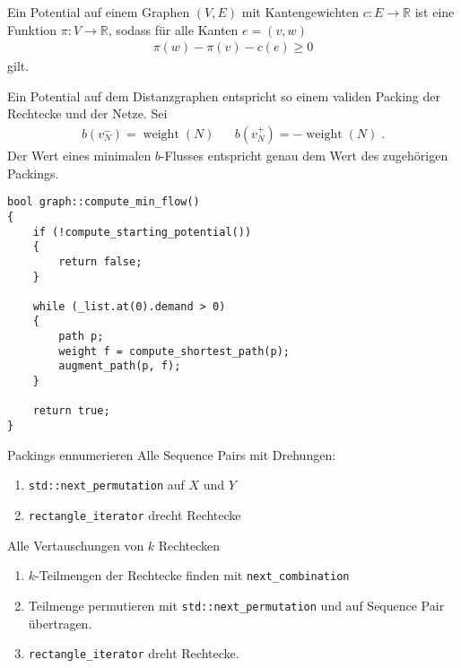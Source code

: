 \documentclass{beamer}
\DeclareMathOperator{\gewicht}{weight}
\begin{document}
\begin{frame}
 \begin{definition}[Potential]
  Ein Potential auf einem Graphen $(V,E)$ mit Kantengewichten $c\colon E \to \mathbb{R}$ ist eine Funktion $\pi\colon V\to \mathbb{R}$, sodass für alle Kanten $e=(v,w)$
  \begin{align*}
   \pi(w) - \pi(v) - c(e) \geq 0
  \end{align*}
  gilt.
 \end{definition}
 
 Ein Potential auf dem Distanzgraphen entspricht so einem validen Packing der Rechtecke und der Netze. Sei 
 \begin{align*}
  b(v_N^-) = \gewicht(N) && b(v_N^+) = -\gewicht(N)\;.
 \end{align*}
 Der Wert eines minimalen $b$-Flusses entspricht genau dem Wert des zugehörigen Packings.
\end{frame}

\begin{frame}[fragile]
\begin{lstlisting}[basicstyle=\scriptsize]
bool graph::compute_min_flow()
{
    if (!compute_starting_potential())
    {
        return false;
    }

    while (_list.at(0).demand > 0)
    {
        path p;
        weight f = compute_shortest_path(p);
        augment_path(p, f);
    }

    return true;
}
\end{lstlisting}
\end{frame}

\begin{frame}{Packings ennumerieren}
 Alle Sequence Pairs mit Drehungen:
 \begin{enumerate}
   \item \texttt{std::next\_permutation} auf $X$ und $Y$
   \item \texttt{rectangle\_iterator} drecht Rechtecke
 \end{enumerate}
 
 Alle Vertauschungen von $k$ Rechtecken
 \begin{enumerate}
   \item $k$-Teilmengen der Rechtecke finden mit \texttt{next\_combination}
   \item Teilmenge permutieren mit \texttt{std::next\_permutation} und auf Sequence Pair übertragen. 
   \item \texttt{rectangle\_iterator} dreht Rechtecke.
 \end{enumerate}


\end{frame}
\end{document}
